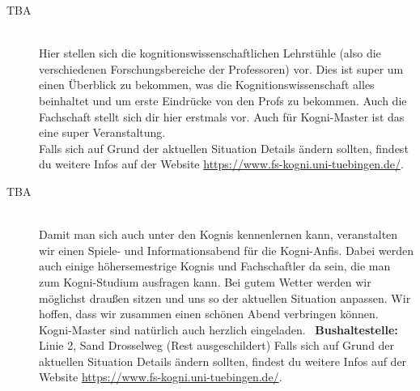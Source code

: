 \begin{description}
	\fi
\fi


\ifkogwiss
	\item[TBA]\ \\
	Hier stellen sich die kognitionswissenschaftlichen Lehrstühle (also die verschiedenen Forschungsbereiche der Professoren) vor. Dies ist super um einen Überblick zu bekommen, was die Kognitionswissenschaft alles beinhaltet und um erste Eindrücke von den Profs zu bekommen. Auch die Fachschaft stellt sich dir hier erstmals vor. %
	Auch für Kogni-Master ist das eine super Veranstaltung. \\
	Falls sich auf Grund der aktuellen Situation Details ändern sollten, findest du weitere Infos auf der Website \url{https://www.fs-kogni.uni-tuebingen.de/}.
\fi


\ifkogwiss
	\item[TBA]\ \\
	Damit man sich auch unter den Kognis kennenlernen kann, veranstalten wir einen Spiele- und Informationsabend für die Kogni-Anfis. Dabei werden auch einige höhersemestrige Kognis und Fachschaftler da sein, die man zum Kogni-Studium ausfragen kann. Bei gutem Wetter werden wir möglichst draußen sitzen und uns so der aktuellen Situation anpassen. Wir hoffen, dass wir zusammen einen schönen Abend verbringen können. Kogni-Master sind natürlich auch herzlich eingeladen.
	~\textbf{Bushaltestelle:} Linie 2, Sand Drosselweg (Rest ausgeschildert)
	Falls sich auf Grund der aktuellen Situation Details ändern sollten, findest du weitere Infos auf der Website \url{https://www.fs-kogni.uni-tuebingen.de/}.
\fi

 





\end{description}
